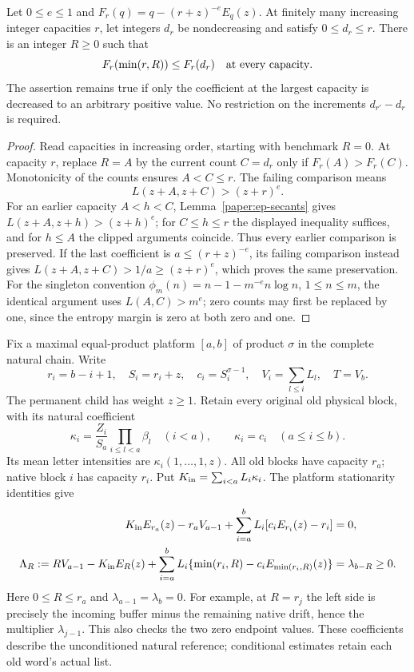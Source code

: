 \begin{lemma}\label{paper:ep-compression}
Let $0\leq e\leq1$ and $F_r(q)=q-(r+z)^{-e}E_q(z)$.
At finitely many increasing integer capacities $r$, let integers $d_r$
be nondecreasing and satisfy $0\leq d_r\leq r$.  There is an integer
$R\geq0$ such that
\[
 F_r(\min(r,R))\leq F_r(d_r)\quad\hbox{at every capacity}.
\]
The assertion remains true if only the coefficient at the largest
capacity is decreased to an arbitrary positive value.  No restriction
on the increments $d_{r'}-d_r$ is required.
\end{lemma}
\begin{proof}
Read capacities in increasing order, starting with benchmark $R=0$.
At capacity $r$, replace $R=A$ by the current count $C=d_r$ only if
$F_r(A)>F_r(C)$.  Monotonicity of the counts ensures $A<C\leq r$.
The failing comparison means
\[
 L(z+A,z+C)>(z+r)^e.
\]
For an earlier capacity $A<h<C$, Lemma~\ref{paper:ep-secants} gives
$L(z+A,z+h)>(z+h)^e$; for $C\leq h\leq r$ the displayed
inequality suffices, and for $h\leq A$ the clipped arguments coincide.
Thus every earlier comparison is preserved.  If the last coefficient
is $a\leq(r+z)^{-e}$, its failing comparison instead gives
$L(z+A,z+C)>1/a\geq(z+r)^e$, which proves the same preservation.
For the singleton convention
$\phi_m(n)=n-1-m^{-e}n\log n$, $1\leq n\leq m$, the identical
argument uses $L(A,C)>m^e$; zero counts may first be replaced by one,
since the entropy margin is zero at both zero and one.
\end{proof}

Fix a maximal equal-product platform $[a,b]$ of product $\sigma$ in
the complete natural chain.  Write
\[
 r_i=b-i+1,\quad S_i=r_i+z,\quad c_i=S_i^{\sigma-1},\quad
 V_i=\sum_{l\leq i}L_l,\quad T=V_b.
\]
The permanent child has weight $z\geq1$.  Retain every original old
physical block, with its natural coefficient
\begin{equation}\label{paper:ep-old-coeff}
 \kappa_i=\frac{Z_i}{S_a}\prod_{i\leq l<a}\beta_l\quad(i<a),
 \qquad \kappa_i=c_i\quad(a\leq i\leq b).
\end{equation}
Its mean letter intensities are $\kappa_i(1,\ldots,1,z)$.
All old blocks have capacity $r_a$; native block $i$ has capacity $r_i$.
Put $K_{\rm in}=\sum_{i<a}L_i\kappa_i$.  The platform stationarity
identities give
\begin{align}
 K_{\rm in}E_{r_a}(z)-r_aV_{a-1}
    +\sum_{i=a}^bL_i[c_iE_{r_i}(z)-r_i]&=0,\label{paper:ep-balance}\\
 \Lambda_R:=RV_{a-1}-K_{\rm in}E_R(z)
    +\sum_{i=a}^bL_i\{\min(r_i,R)-c_iE_{\min(r_i,R)}(z)\}
    &=\lambda_{b-R}\geq0.\label{paper:ep-suffix-buffer}
\end{align}
Here $0\leq R\leq r_a$ and $\lambda_{a-1}=\lambda_b=0$.
For example, at $R=r_j$ the left side is precisely the incoming
buffer minus the remaining native drift, hence the multiplier
$\lambda_{j-1}$.  This also checks the two zero endpoint values.
These coefficients describe the unconditioned natural reference;
conditional estimates retain each old word's actual list.

